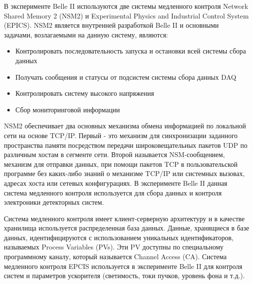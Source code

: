   В эксперименте Belle II используются две системы медленного контроля Network Shared Memory 2 (NSM2) и Experimental Physics and Industrial Control System (EPICS). NSM2 является внутренней разработкой Belle II и основными задачами, возлагаемыми на данную систему, являются\cite{TechRep}:
\begin{itemize}
  \item Контролировать последовательность запуска и остановки всей системы сбора данных
  \item Получать сообщения и статусы от подсистем системы сбора данных DAQ
  \item Контролировать систему высокого напряжения
  \item Сбор мониторинговой информации
\end{itemize}
NSM2 обеспечивает два основных механизма обмена информацией по локальной сети на основе TCP/IP. Первый - это механизм для синхронизации заданного пространства памяти посредством передачи широковещательных пакетов UDP по различным хостам в сегменте сети. Второй называется NSM-сообщением, механизм для отправки данных, при помощи пакетов TCP в пользовательской программе без каких-либо знаний о механизме TCP/IP или системных вызовах, адресах хоста или сетевых конфигурациях. В эксперименте Belle II данная система медленного контроля используется для сбора данных и контроля электроники детекторных систем\cite{NSM}.\par
  Система медленного контроля имеет клиент-серверную архитектуру и в качестве хранилища используется распределенная база данных. Данные, хранящиеся в базе данных, идентифицируются с использованием уникальных идентификаторов, называемых Process Variables (PVs). Эти PV доступны по специальному программному каналу, который называется Channel Access (CA)\cite{EPICS}. Система медленного контроля EPCIS используется в эксперименте Belle II для контроля систем и параметров ускорителя (светимость, токи пучков, уровень фона и т.д.).
